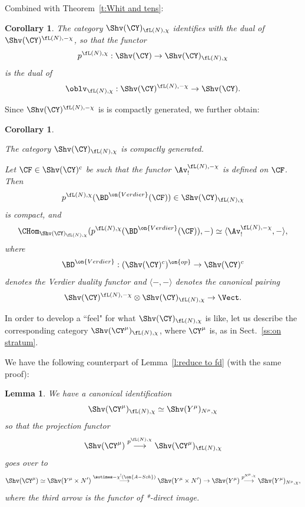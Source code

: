 \documentclass[9pt]{amsart}
\newtheorem{cor}[subsubsection]{Corollary}
\newtheorem{lem}[subsubsection]{Lemma}
\theoremstyle{definition}
\theoremstyle{remark}
\newcommand{\thmref}[1]{Theorem~\ref{#1}}
\newcommand{\secref}[1]{Sect.~\ref{#1}}
\newcommand{\lemref}[1]{Lemma~\ref{#1}}
\numberwithin{equation}{section}
\begin{document}
\medskip

Combined with \thmref{t:Whit and tens}:

\begin{cor}  \label{c:dual dualizable} 
The category $\Shv(\CY)_{\fL(N),\chi}$ identifies with the dual of $\Shv(\CY)^{\fL(N),-\chi}$, so that the functor
$$p^{\fL(N),\chi}:\Shv(\CY)\to \Shv(\CY)_{\fL(N),\chi}$$
is the dual of
$$\oblv_{\fL(N),\chi}:\Shv(\CY)^{\fL(N),-\chi}\to \Shv(\CY).$$
\end{cor}

Since $\Shv(\CY)^{\fL(N),-\chi}$ is is compactly generated, we further obtain:

\begin{cor}  \label{c:dual compact}  \hfill

\smallskip

The category $\Shv(\CY)_{\fL(N),\chi}$ is compactly generated.

\smallskip

 Let $\CF\in \Shv(\CY)^c$ be such that the functor 
$\Av^{\fL(N),-\chi}_!$ is defined on $\CF$. Then 
$$p^{\fL(N),\chi}(\BD^{\on{Verdier}}(\CF))\in \Shv(\CY)_{\fL(N),\chi}$$
is compact, and 
$$\CHom_{\Shv(\CY)_{\fL(N),\chi}}(p^{\fL(N),\chi}(\BD^{\on{Verdier}}(\CF)),-)\simeq
\langle \Av^{\fL(N),-\chi}_!,-\rangle,$$
where 
$$\BD^{\on{Verdier}}:(\Shv(\CY)^c)^{\on{op}}\to \Shv(\CY)^c$$
denotes the Verdier duality functor and $\langle -,-\rangle$ denotes the canonical pairing
$$\Shv(\CY)^{\fL(N),-\chi}\otimes \Shv(\CY)_{\fL(N),\chi}\to \Vect.$$

\end{cor} 

\sssec{}

In order to develop a ``feel" for what $\Shv(\CY)_{\fL(N),\chi}$ is like, let us describe the corresponding category
$\Shv(\CY^\mu)_{\fL(N),\chi}$, where $\CY^\mu$ is, as in \secref{ss:on stratum}.

\medskip

We have the following counterpart of \lemref{l:reduce to fd} (with the same proof):

\begin{lem}  \label{l:reduce to fd co}
We have a canonical identification 
$$ \Shv(\CY^\mu)_{\fL(N),\chi}\simeq \Shv(Y^\mu)_{N^\mu,\chi}$$
so that the projection functor 
$$\Shv(\CY^\mu) \overset{p^{\fL(N),\chi}}\longrightarrow \Shv(\CY^\mu)_{\fL(N),\chi}$$
goes over to 
$$\Shv(\CY^\mu) \simeq \Shv(Y^\mu\times N')   \overset{\sotimes -\chi^!(\on{A-Sch})}\longrightarrow \Shv(Y^\mu\times N')
\to \Shv(Y^\mu) \overset{p^{N^\mu,\chi}}\longrightarrow
\Shv(Y^\mu)_{N^\mu,\chi},$$
where the third arrow is the functor of *-direct image. 
\end{lem} 
\end{document}
